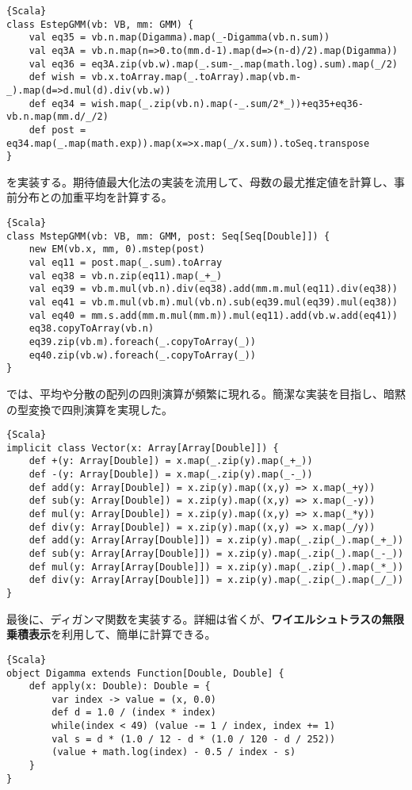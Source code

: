 \documentclass[10pt,a4paper]{book}
\begin{document}
\begin{Verbatim}{Scala}
class EstepGMM(vb: VB, mm: GMM) {
	val eq35 = vb.n.map(Digamma).map(_-Digamma(vb.n.sum))
	val eq3A = vb.n.map(n=>0.to(mm.d-1).map(d=>(n-d)/2).map(Digamma))
	val eq36 = eq3A.zip(vb.w).map(_.sum-_.map(math.log).sum).map(_/2)
	def wish = vb.x.toArray.map(_.toArray).map(vb.m-_).map(d=>d.mul(d).div(vb.w))
	def eq34 = wish.map(_.zip(vb.n).map(-_.sum/2*_))+eq35+eq36-vb.n.map(mm.d/_/2)
	def post = eq34.map(_.map(math.exp)).map(x=>x.map(_/x.sum)).toSeq.transpose
}
\end{Verbatim}

\Mstep{}を実装する。期待値最大化法の実装を流用して、母数の最尤推定値を計算し、事前分布との加重平均を計算する。

\begin{Verbatim}{Scala}
class MstepGMM(vb: VB, mm: GMM, post: Seq[Seq[Double]]) {
	new EM(vb.x, mm, 0).mstep(post)
	val eq11 = post.map(_.sum).toArray
	val eq38 = vb.n.zip(eq11).map(_+_)
	val eq39 = vb.m.mul(vb.n).div(eq38).add(mm.m.mul(eq11).div(eq38))
	val eq41 = vb.m.mul(vb.m).mul(vb.n).sub(eq39.mul(eq39).mul(eq38))
	val eq40 = mm.s.add(mm.m.mul(mm.m)).mul(eq11).add(vb.w.add(eq41))
	eq38.copyToArray(vb.n)
	eq39.zip(vb.m).foreach(_.copyToArray(_))
	eq40.zip(vb.w).foreach(_.copyToArray(_))
}
\end{Verbatim}

\Mstep{}では、平均や分散の配列の四則演算が頻繁に現れる。簡潔な実装を目指し、暗黙の型変換で四則演算を実現した。

\begin{Verbatim}{Scala}
implicit class Vector(x: Array[Array[Double]]) {
	def +(y: Array[Double]) = x.map(_.zip(y).map(_+_))
	def -(y: Array[Double]) = x.map(_.zip(y).map(_-_))
	def add(y: Array[Double]) = x.zip(y).map((x,y) => x.map(_+y))
	def sub(y: Array[Double]) = x.zip(y).map((x,y) => x.map(_-y))
	def mul(y: Array[Double]) = x.zip(y).map((x,y) => x.map(_*y))
	def div(y: Array[Double]) = x.zip(y).map((x,y) => x.map(_/y))
	def add(y: Array[Array[Double]]) = x.zip(y).map(_.zip(_).map(_+_))
	def sub(y: Array[Array[Double]]) = x.zip(y).map(_.zip(_).map(_-_))
	def mul(y: Array[Array[Double]]) = x.zip(y).map(_.zip(_).map(_*_))
	def div(y: Array[Array[Double]]) = x.zip(y).map(_.zip(_).map(_/_))
}
\end{Verbatim}

最後に、ディガンマ関数を実装する。詳細は省くが、\textbf{ワイエルシュトラスの無限乗積表示}を利用して、簡単に計算できる。

\begin{Verbatim}{Scala}
object Digamma extends Function[Double, Double] {
	def apply(x: Double): Double = {
		var index -> value = (x, 0.0)
		def d = 1.0 / (index * index)
		while(index < 49) (value -= 1 / index, index += 1)
		val s = d * (1.0 / 12 - d * (1.0 / 120 - d / 252))
		(value + math.log(index) - 0.5 / index - s)
	}
}
\end{Verbatim}
\end{document}
